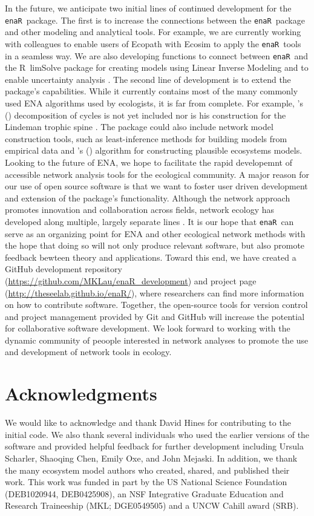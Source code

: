 \documentclass[11pt]{article}
\def\citeapos#1{\citeauthor{#1}'s (\citeyear{#1})}
\newcommand{\R}{R}
\newcommand{\enaR}{\texttt{enaR}}
\begin{document}
\begin{spacing}{2}
In the future, we anticipate two initial lines of continued
development for the \enaR\ package. The first is to increase the
connections between the \enaR\ package and other modeling and
analytical tools.  For example, we are currently working with
colleagues to enable users of Ecopath with Ecosim
\citep{christensen04} to apply the \enaR\ tools in a seamless way.  We
are also developing functions to connect between \enaR\ and the
\R\ limSolve package \citep{soetaert09} for creating models using
Linear Inverse Modeling and to enable uncertainty analysis
\citep{kones09}. The second line of development is to extend the
package's capabilities.  While it currently contains most of the many
commonly used ENA algorithms used by ecologists, it is far from
complete. For example, \citeapos{ulanowicz83} decomposition of cycles
is not yet included nor is his construction for the Lindeman trophic
spine \citep{ulanowicz1979trophic}. The package could also include
network model construction tools, such as least-inference methods for
building models from empirical data \citep{ulanowicz2008least} and
\citeapos{fath04_cyber} algorithm for constructing plausible
ecosystems models.
%
Looking to the future of ENA, we hope to facilitate the rapid
developemnt of accessible network analysis tools for the ecological
community. A major reason for our use of open source software is that
we want to foster user driven development and extension of the
package's functionality. Although the network approach promotes
innovation and collaboration across fields, network ecology has
developed along multiple, largely separate lines
\citep{scharler09comparing,allesina2012}.  It is our hope that
\enaR\ can serve as an organizing point for ENA and other ecological
network methods with the hope that doing so will not only produce
relevant software, but also promote feedback bewteen theory and
applications. Toward this end, we have created a GitHub development
repository (\url{https://github.com/MKLau/enaR_development}) and
project page (\url{http://theseelab.github.io/enaR/}), where
researchers can find more information on how to contribute
software. Together, the open-source tools for version control and
project management provided by Git and GitHub will increase the
potential for collaborative software development. We look forward to
working with the dynamic community of peoople interested in network
analyses to promote the use and development of network tools in
ecology.

\section{Acknowledgments}
We would like to acknowledge and thank David Hines for contributing to
the initial code.  We also thank several individuals who used the
earlier versions of the software and provided helpful feedback for
further development including Ursula Scharler, Shaoqing Chen, Emily
Oxe, and John Mejaski.  In addition, we thank the many ecosystem model
authors who created, shared, and published their work.  This work was
funded in part by the US National Science Foundation (DEB1020944,
DEB0425908), an NSF Integrative Graduate Education and Research
Traineeship (MKL; DGE0549505) and a UNCW Cahill award (SRB).


\end{spacing}
\end{document}
